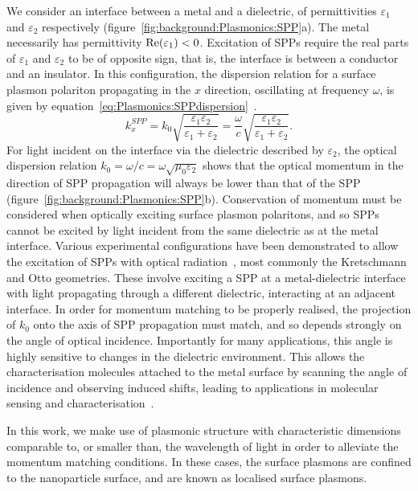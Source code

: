 We consider an interface between a metal and a dielectric, of permittivities $\varepsilon_1$ and $\varepsilon_2$ respectively (figure~\ref{fig:background:Plasmonics:SPP}a). The metal necessarily has permittivity ${\mathop{\rm Re}\nolimits}(\varepsilon_1)<0$. Excitation of SPPs require the real parts of $\varepsilon_1$ and $\varepsilon_2$ to be of opposite sign, that is, the interface is between a conductor and an insulator. In this configuration, the dispersion relation for a surface plasmon polariton propagating in the $x$ direction, oscillating at frequency $\omega$, is given by equation~\ref{eq:Plasmonics:SPPdispersion}~\cite[\S 2.2]{Maier2007}. 
\begin{equation}\label{eq:Plasmonics:SPPdispersion}
    k^{SPP}_{x} = k_0 \sqrt{\frac{\varepsilon_{1}\varepsilon_{2}}{\varepsilon_{1}+\varepsilon_{2}}} = \frac{\omega}{c} \sqrt{\frac{\varepsilon_{1}\varepsilon_{2}}{\varepsilon_{1}+\varepsilon_{2}}}.
\end{equation}
For light incident on the interface via the dielectric described by $\varepsilon_2$, the optical dispersion relation $k_0 = \omega / c = \omega \sqrt{\mu_0 \varepsilon_2}$ shows that the optical momentum in the direction of SPP propagation will always be lower than that of the SPP (figure~\ref{fig:background:Plasmonics:SPP}b). Conservation of momentum must be considered when optically exciting surface plasmon polaritons, and so SPPs cannot be excited by light incident from the same dielectric as at the metal interface. Various experimental configurations have been demonstrated to allow the excitation of SPPs with optical radiation~\cite{Maier2007, Roh2011}, most commonly the Kretschmann and Otto geometries. These involve exciting a SPP at a metal-dielectric interface with light propagating through a different dielectric, interacting at an adjacent interface. In order for momentum matching to be properly realised, the projection of $k_0$ onto the axis of SPP propagation must match, and so depends strongly on the angle of optical incidence. Importantly for many applications, this angle is highly sensitive to changes in the dielectric environment. This allows the characterisation molecules attached to the metal surface by scanning the angle of incidence and observing induced shifts, leading to applications in molecular sensing and characterisation~\cite{Roh2011}.

In this work, we make use of plasmonic structure with characteristic dimensions comparable to, or smaller than, the wavelength of light in order to alleviate the momentum matching conditions. In these cases, the surface plasmons are confined to the nanoparticle surface, and are known as localised surface plasmons.


